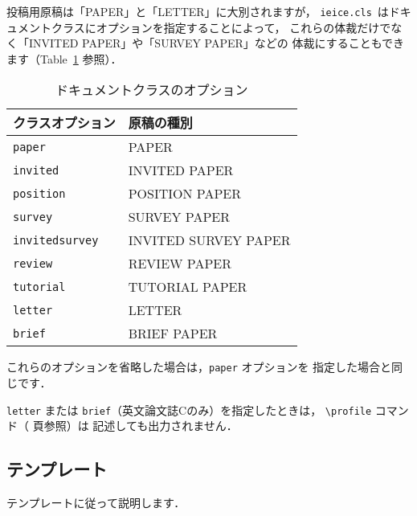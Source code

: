 \documentclass[paper]{ieice}
\def\ClassFile{\texttt{ieice.cls}}
\begin{document}
投稿用原稿は「PAPER」と「LETTER」に大別されますが，
\ClassFile\ はドキュメントクラスにオプションを指定することによって，
これらの体裁だけでなく「INVITED PAPER」や「SURVEY PAPER」などの
体裁にすることもできます（Table~\ref{classoption} 参照）．

\begin{table}[tb]
\caption{ドキュメントクラスのオプション}
\label{classoption}
\begin{center}
\begin{tabular}{ll}
\hline
\textbf{クラスオプション} & \textbf{原稿の種別}\\
\hline
\texttt{paper}         & \textsf{PAPER}\\
\texttt{invited}       & \textsf{INVITED PAPER}\\
\texttt{position}      & \textsf{POSITION PAPER}\\
\texttt{survey}        & \textsf{SURVEY PAPER}\\
\texttt{invitedsurvey} & \textsf{INVITED SURVEY PAPER}\\
\texttt{review}        & \textsf{REVIEW PAPER}\\
\texttt{tutorial}      & \textsf{TUTORIAL PAPER}\\
\hline
\texttt{letter}        & \textsf{LETTER}\\
\texttt{brief}         & \textsf{BRIEF PAPER}\\
\hline
\end{tabular}
\end{center}
\end{table}

これらのオプションを省略した場合は，\texttt{paper} オプションを
指定した場合と同じです．


\texttt{letter} または \texttt{brief}（英文論文誌Cのみ）を指定したときは，
\verb/\profile/ コマンド（\pageref{profile:command} 頁参照）は
記述しても出力されません．

\subsection{テンプレート}

テンプレートに従って説明します．
\end{document}
